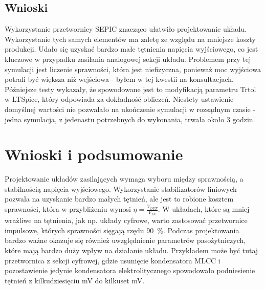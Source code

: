 \documentclass[11pt]{article}
\begin{document}
\subsection{Wnioski}
Wykorzystanie przetwornicy SEPIC znacząco ułatwiło projektowanie układu. Wykorzystanie tych samych elementów ma zaletę ze względu na mniejsze koszty produkcji. Udało się uzyskać bardzo małe tętnienia napięcia wyjściowego, co jest kluczowe w przypadku zasilania analogowej sekcji układu. Problemem przy tej symulacji jest liczenie sprawności, która jest niefizyczna, ponieważ moc wyjściowa potrafi być większa niż wejściowa - byłem w tej kwestii na konsultacjach. Późniejsze testy wykazały, że spowodowane jest to modyfikacją parametru Trtol w LTSpice, który odpowiada za dokładność obliczeń. Niestety ustawienie domyślnej wartości nie pozwalało na ukończenie symulacji w rozsądnym czasie - jedna symulacja, z jedenastu potrzebnych do wykonania, trwała około 3 godzin.

\section{Wnioski i podsumowanie}
Projektowanie układów zasilających wymaga wyboru między sprawnością, a stabilnością napięcia wyjściowego. Wykorzystanie stabilizatorów liniowych pozwala na uzyskanie bardzo małych tętnień, ale jest to robione kosztem sprawności, która w przybliżeniu wynosi $\eta = \frac{V_{OUT}}{V_{IN}}$. W układach, które są mniej wrażliwe na tętnienia, jak np. układy cyfrowe, warto zastosować przetwornice impulsowe, których sprawności sięgają rzędu \SI{90}{\percent}.
Podczas projektowania bardzo ważne okazuje się również uwzględnienie parametrów pasożytniczych, które mają bardzo duży wpływ na działanie układu. Przykładem może być tutaj przetwornica z sekcji cyfrowej, gdzie usunięcie kondensatora MLCC i pozostawienie jedynie kondensatora elektrolitycznego spowodowało podniesienie tętnień z kilkudziesięciu mV do kilkuset mV.
\end{document}
